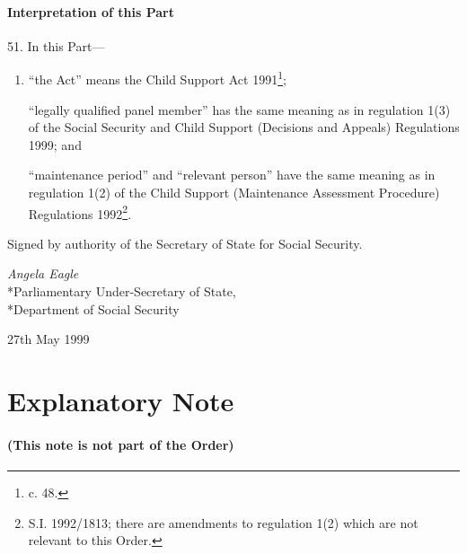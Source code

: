\documentclass[12pt,a4paper]{article}
\begin{document}
\subsection[51. Interpretation of this Part]{Interpretation of this Part}

51.  In this Part—
\begin{enumerate}\item[]
“the Act” means the Child Support Act 1991\footnote{ c. 48.};

“legally qualified panel member” has the same meaning as in regulation 1(3) of the Social Security and Child Support (Decisions and Appeals) Regulations 1999; and

“maintenance period” and “relevant person” have the same meaning as in regulation 1(2) of the Child Support (Maintenance Assessment Procedure) Regulations 1992\footnote{\frenchspacing S.I. 1992/1813; there are amendments to regulation 1(2) which are not relevant to this Order.}. 
\end{enumerate}

\bigskip

Signed 
by authority of the Secretary of State for Social Security.

{\raggedleft
\emph{Angela Eagle
}\\*Parliamentary Under-Secretary of State,\\*Department of Social Security

}

27th May 1999

\small

\part{Explanatory Note}

\renewcommand\parthead{--- Explanatory Note}

\subsection*{(This note is not part of the Order)}
\end{document}
